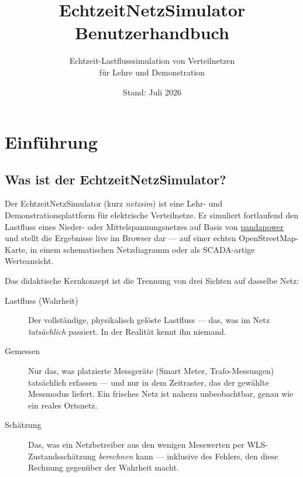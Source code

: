 \documentclass[11pt,a4paper,parskip=half]{scrreprt}
\title{EchtzeitNetzSimulator\\\Large Benutzerhandbuch}
\subtitle{Echtzeit-Lastflusssimulation von Verteilnetzen\\für Lehre und Demonstration}
\author{}
\date{Stand: Juli 2026}
\begin{document}
\maketitle

\begin{center}
\end{center}

\tableofcontents

\chapter{Einführung}

\section{Was ist der EchtzeitNetzSimulator?}

Der EchtzeitNetzSimulator (kurz \emph{netzsim}) ist eine Lehr- und
Demonstrationsplattform für elektrische Verteilnetze. Er simuliert
fortlaufend den Lastfluss eines Nieder- oder Mittelspannungsnetzes auf
Basis von \href{https://github.com/e2nIEE/pandapower}{pandapower} und
stellt die Ergebnisse live im Browser dar --- auf einer echten
OpenStreetMap-Karte, in einem schematischen Netzdiagramm oder als
SCADA-artige Werteansicht.

Das didaktische Kernkonzept ist die Trennung von drei Sichten auf
dasselbe Netz:

\begin{description}
  \item[Lastfluss (Wahrheit)] Der vollständige, physikalisch gelöste
    Lastfluss --- das, was im Netz \emph{tatsächlich} passiert. In der
    Realität kennt ihn niemand.
  \item[Gemessen] Nur das, was platzierte Messgeräte (Smart Meter,
    Trafo-Messungen) tatsächlich erfassen --- und nur in dem Zeitraster,
    das der gewählte Messmodus liefert. Ein frisches Netz ist nahezu
    unbeobachtbar, genau wie ein reales Ortsnetz.
  \item[Schätzung] Das, was ein Netzbetreiber aus den wenigen Messwerten
    per WLS-Zustandsschätzung \emph{berechnen} kann --- inklusive des
    Fehlers, den diese Rechnung gegenüber der Wahrheit macht.
\end{description}
\end{document}
